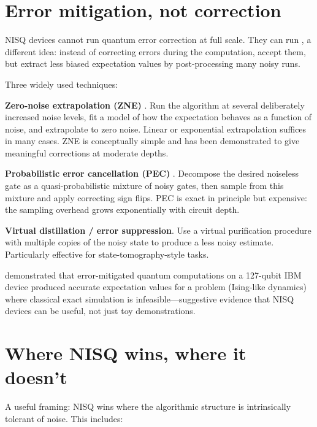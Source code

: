 \section{Error mitigation, not correction}

NISQ devices cannot run quantum error correction at full scale. They can run , a different idea: instead of correcting errors during the computation, accept them, but extract less biased expectation values by post-processing many noisy runs.

Three widely used techniques:

\textbf{Zero-noise extrapolation (ZNE)} \citep{temme_error_2017}. Run the algorithm at several deliberately increased noise levels, fit a model of how the expectation behaves as a function of noise, and extrapolate to zero noise. Linear or exponential extrapolation suffices in many cases. ZNE is conceptually simple and has been demonstrated to give meaningful corrections at moderate depths.

\textbf{Probabilistic error cancellation (PEC)} \citep{temme_error_2017}. Decompose the desired noiseless gate as a quasi-probabilistic mixture of noisy gates, then sample from this mixture and apply correcting sign flips. PEC is exact in principle but expensive: the sampling overhead grows exponentially with circuit depth.

\textbf{Virtual distillation / error suppression}. Use a virtual purification procedure with multiple copies of the noisy state to produce a less noisy estimate. Particularly effective for state-tomography-style tasks.

\citet{kim_evidence_2023} demonstrated that error-mitigated quantum computations on a 127-qubit IBM device produced accurate expectation values for a problem (Ising-like dynamics) where classical exact simulation is infeasible---suggestive evidence that NISQ devices can be useful, not just toy demonstrations.

\section{Where NISQ wins, where it doesn't}

A useful framing: NISQ wins where the algorithmic structure is intrinsically tolerant of noise. This includes:

